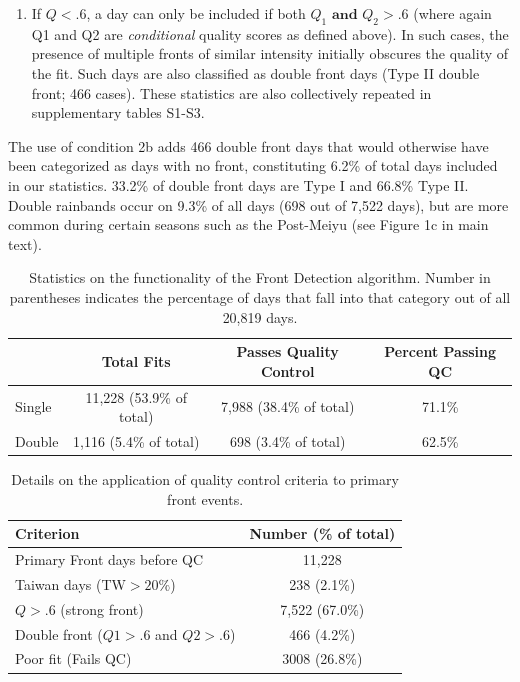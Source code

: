 \documentclass[draft,grl]{agutexSI}
\begin{document}
\begin{article}
\begin{enumerate}
\begin{enumerate}
	\item If $Q<.6$, a day can only be included if both $Q_1 \mathrm{\textbf{ and }} Q_2 > .6$ (where again Q1 and Q2 are \textit{conditional} quality scores as defined above). In such cases, the presence of multiple fronts of similar intensity initially obscures the quality of the fit. Such days are also classified as double front days (Type II double front; 466 cases). These statistics are also collectively repeated in supplementary tables S1-S3.
	
	\end{enumerate}
	
\end{enumerate}	
	
	The use of condition 2b adds 466 double front days that would otherwise have been categorized as days with no front, constituting 6.2\% of total days included in our statistics. 33.2\% of double front days are Type I and 66.8\% Type II. Double rainbands occur on 9.3\% of all days (698 out of 7,522 days), but are more common during certain seasons such as the Post-Meiyu (see Figure 1c in main text).
	
\clearpage

\begin{table}

\caption{Statistics on the functionality of the Front Detection algorithm. Number in parentheses indicates the percentage of days that fall into that category out of all 20,819 days.}
\centering

\begin{tabular}{ l c c c}
	  & Total Fits & Passes Quality Control & Percent Passing QC\\
	 \hline
	 Single & 11,228 (53.9\% of total) & 7,988 (38.4\% of total) & 71.1\% \\
	 Double & 1,116 (5.4\% of total) & 698 (3.4\% of total) & 62.5\% \\
\end{tabular}
\end{table}

\begin{table}

\caption{Details on the application of quality control criteria to primary front events.}
\centering

\begin{tabular}{ l c}
	 Criterion & Number (\% of total) \\
	 \hline
	 Primary Front days before QC & 11,228 \\
	 Taiwan days (TW$>20\%$) & 238 (2.1\%) \\
	 $Q>.6$ (strong front) & 7,522 (67.0\%) \\
	 Double front ($Q1>.6$ and $Q2>.6$) & 466 (4.2\%) \\
	 Poor fit (Fails QC) & 3008 (26.8\%) \\
	 

\end{tabular}
\end{table}
\end{article}
\end{document}
